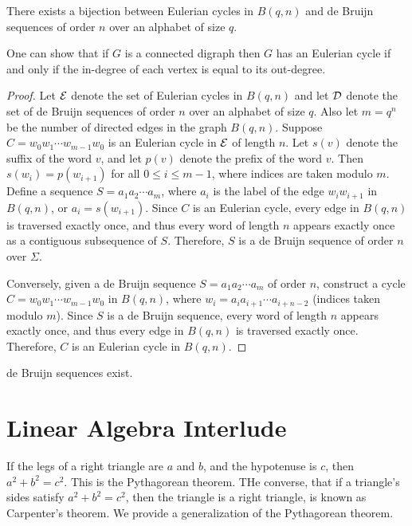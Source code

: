 \begin{theorem}
    There exists a bijection between Eulerian cycles in $B(q,n)$ and de Bruijn sequences of order $n$ over an alphabet of size $q$.
\end{theorem}

One can show that if $G$ is a connected digraph then $G$ has an Eulerian cycle if and only if the in-degree of each vertex is equal to its out-degree.

\begin{proof}
    Let $\mathcal{E}$ denote the set of Eulerian cycles in $B(q,n)$ and let $\mathcal{D}$ denote the set of de Bruijn sequences of order $n$ over an alphabet of size $q$. Also let $m = q^{n}$ be the number of directed edges in the graph $B(q,n)$. Suppose $C = w_{0}w_{1}\cdots w_{m-1}w_{0}$ is an Eulerian cycle in $\mathcal{E}$ of length $n$. Let $s(v)$ denote the suffix of the word $v$, and let $p(v)$ denote the prefix of the word $v$. Then $s(w_{i}) = p(w_{i+1})$ for all $0 \leq i \leq m-1$, where indices are taken modulo $m$. Define a sequence $S = a_{1}a_{2}\cdots a_{m}$, where $a_{i}$ is the label of the edge $w_{i}w_{i+1}$ in $B(q,n)$, or $a_{i} = s(w_{i+1})$. Since $C$ is an Eulerian cycle, every edge in $B(q,n)$ is traversed exactly once, and thus every word of length $n$ appears exactly once as a contiguous subsequence of $S$. Therefore, $S$ is a de Bruijn sequence of order $n$ over $\Sigma$.

    Conversely, given a de Bruijn sequence $S = a_{1}a_{2}\cdots a_{m}$ of order $n$, construct a cycle $C = w_{0}w_{1}\cdots w_{m-1}w_{0}$ in $B(q,n)$, where $w_{i} = a_{i}a_{i+1}\cdots a_{i+n-2}$ (indices taken modulo $m$). Since $S$ is a de Bruijn sequence, every word of length $n$ appears exactly once, and thus every edge in $B(q,n)$ is traversed exactly once. Therefore, $C$ is an Eulerian cycle in $B(q,n)$.
\end{proof}

\begin{corollary}
    de Bruijn sequences exist.
\end{corollary}

\section{Linear Algebra Interlude}
If the legs of a right triangle are $a$ and $b$, and the hypotenuse is $c$, then $a^{2} + b^{2} = c^{2}$. This is the Pythagorean theorem. THe converse, that if a triangle's sides satisfy $a^{2} + b^{2} = c^{2}$, then the triangle is a right triangle, is known as Carpenter's theorem. We provide a generalization of the Pythagorean theorem.

